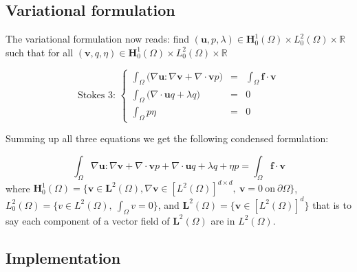 \subsection{Variational formulation}
\label{sec:vari-form}

The variational formulation now reads: find $(\mathbf{u}, p,
\lambda) \in \mathbf{H}^1_0(\Omega) \times L^2_0(\Omega) \times
\mathbb{R}$ such that for all $(\mathbf{v}, q, \eta) \in
\mathbf{H}^1_0(\Omega) \times L^2_0(\Omega) \times \mathbb{R}$

\begin{equation}
  \label{notes:eq:20}
  \mbox{Stokes 3: }\left\{
    \begin{array}{rcl}
      \int_\Omega \Big(\nabla \mathbf{u} \colon \nabla \mathbf{v} + \nabla \cdot \mathbf{v} p\Big) &=& \int_\Omega \mathbf{f} \cdot \mathbf{v}\\
      \int_\Omega \Big(\nabla\cdot\mathbf{u} q + \lambda q\Big)   &=& 0\\
      \int_\Omega p \eta &=& 0
    \end{array}
  \right.
\end{equation}

Summing up all three equations we get the following condensed formulation:

\begin{equation}
  \label{notes:eq:19}
  \int_\Omega \nabla \mathbf{u} \colon \nabla \mathbf{v} + \nabla \cdot \mathbf{v} p + \nabla \cdot \mathbf{u} q + \lambda q + \eta p = \int_\Omega \mathbf{f} \cdot \mathbf{v}
\end{equation}
where $\mathbf{H}^1_0(\Omega)= \Big\{ \mathbf{v} \in \mathbf{L}^2(\Omega), \nabla \mathbf{v} \in [L^2(\Omega)]^{d\times d},\ \mathbf{v} = 0\ \text{on}\ \partial \Omega \Big\}$,
$L^2_0(\Omega)= \Big\{ v \in L^2(\Omega),\ \int_\Omega v = 0\Big\}$, and
$\mathbf{L}^2(\Omega)= \Big\{ \mathbf{v} \in [L^2(\Omega)]^d\Big\}$ that is to say each component of a  vector field of $\mathbf{L}^2(\Omega)$ are in $L^2(\Omega)$.


\subsection{Implementation}
\label{sec:implementation}


